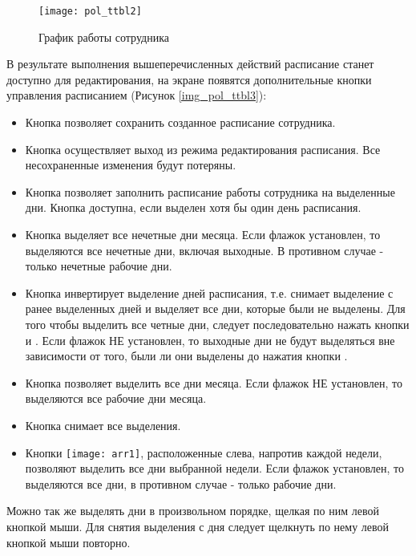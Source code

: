 \begin{figure}[ht]\centering
 \texttt{[image: pol\_ttbl2]}
 \caption{График работы сотрудника}
 \label{img_pol_ttbl2}
\end{figure}

В результате выполнения вышеперечисленных действий расписание станет доступно для редактирования, на экране появятся дополнительные кнопки управления расписанием (Рисунок \ref{img_pol_ttbl3}):
\begin{itemize}
 \item Кнопка  позволяет сохранить созданное расписание сотрудника.
 \item Кнопка  осуществляет выход из режима редактирования расписания. Все несохраненные изменения будут потеряны.
 \item Кнопка  позволяет заполнить расписание работы сотрудника на выделенные дни. Кнопка доступна, если выделен хотя бы один день расписания.
 \item Кнопка  выделяет все нечетные дни месяца. Если флажок  установлен, то выделяются все нечетные дни, включая выходные. В противном случае - только нечетные рабочие дни.
 \item Кнопка  инвертирует выделение дней расписания, т.е. снимает выделение с ранее выделенных дней и выделяет все дни, которые были не выделены. Для того чтобы выделить все четные дни, следует последовательно нажать кнопки  и . Если флажок  НЕ установлен, то выходные дни не будут выделяться вне зависимости от того, были ли они выделены до нажатия кнопки .
 \item Кнопка  позволяет выделить все дни месяца. Если флажок  НЕ установлен, то выделяются все рабочие дни месяца.
 \item Кнопка  снимает все выделения.
 \item Кнопки \texttt{[image: arr1]}, расположенные слева, напротив каждой недели,   позволяют выделить все дни выбранной недели. Если флажок  установлен, то выделяются все дни, в противном случае - только рабочие дни.
\end{itemize}

Можно так же выделять дни в произвольном порядке, щелкая по ним левой кнопкой мыши. Для снятия выделения с дня следует щелкнуть по нему левой кнопкой мыши повторно.

